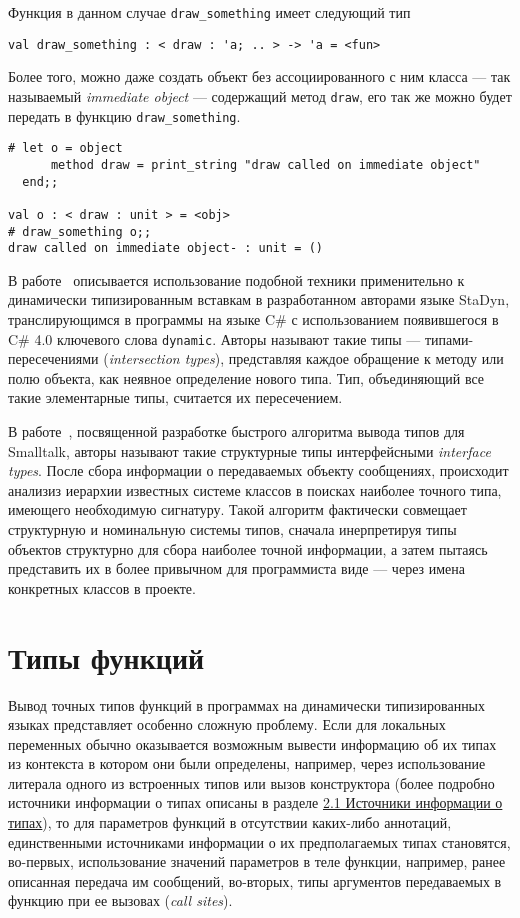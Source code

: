 Функция в данном случае \texttt{draw\_something} имеет следующий тип

\begin{lstlisting}
val draw_something : < draw : 'a; .. > -> 'a = <fun>
\end{lstlisting}

Более того, можно даже создать объект без ассоциированного с ним класса --- так
называемый \emph{immediate object} --- содержащий метод \texttt{draw}, его так
же можно будет передать в функцию \texttt{draw\_something}.

\begin{lstlisting}
# let o = object
      method draw = print_string "draw called on immediate object"
  end;;

val o : < draw : unit > = <obj>
# draw_something o;;
draw called on immediate object- : unit = ()
\end{lstlisting}
\lstset{language=Python}

В работе~\cite{Ortin2011:union} описывается использование подобной техники
применительно к динамически типизированным вставкам в разработанном авторами
языке StaDyn, транслирующимся в программы на языке C\# с использованием
появившегося в C\# 4.0 ключевого слова \texttt{dynamic}.  Авторы называют такие
типы --- типами-пересечениями (\emph{intersection types}), представляя каждое
обращение к методу или полю объекта, как неявное определение нового типа. Тип,
объединяющий все такие элементарные типы, считается их пересечением.

В работе~\cite{Pluquet2009}, посвященной разработке быстрого алгоритма вывода
типов для Smalltalk, авторы называют такие структурные типы интерфейсными 
\emph{interface types}. После сбора информации о передаваемых объекту сообщениях,
происходит анализиз иерархии известных системе классов в поисках наиболее
точного типа, имеющего необходимую сигнатуру. Такой алгоритм фактически
совмещает структурную и номинальную системы типов, сначала инерпретируя типы
объектов структурно для сбора наиболее точной информации, а затем пытаясь
представить их в более привычном для программиста виде --- через имена
конкретных классов в проекте.

\section{Типы функций}

Вывод точных типов функций в программах на динамически типизированных языках
представляет особенно сложную проблему. Если для локальных переменных обычно
оказывается возможным вывести информацию об их типах из контекста в котором они
были определены, например, через использование литерала одного из встроенных
типов или вызов конструктора (более подробно источники информации о типах
описаны в разделе \hyperref[sec:type-sources]{2.1 Источники информации о типах}), то
для параметров функций в отсутствии каких-либо аннотаций, единственными
источниками информации о их предполагаемых типах становятся, во-первых,
использование значений параметров в теле функции, например, ранее описанная
передача им сообщений, во-вторых, типы аргументов передаваемых в функцию при ее
вызовах (\emph{call sites}).

